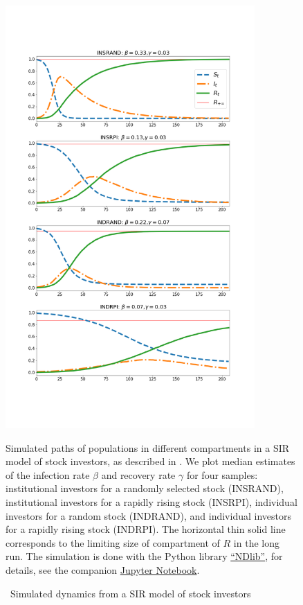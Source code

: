   \begin{figure} \centering  %
    \caption{ ~Simulated dynamics from a SIR model of stock investors}
    \label{fig:sir_simulate}
    \centerline{\includegraphics[width=0.85\textwidth,height=0.85\textheight]{./figures/sir_simulate}}
    \begin{flushleft}
      {\footnotesize Simulated paths of populations in different compartments in a SIR model of stock investors, as described in \cite{shiller1989survey}. We plot median estimates of the infection rate $\beta$ and recovery rate $\gamma$ for four samples: institutional investors for a randomly selected stock (INSRAND), institutional investors for a rapidly rising stock (INSRPI), individual investors for a random stock (INDRAND), and individual investors for a rapidly rising stock (INDRPI). The horizontal thin solid line corresponds to the limiting size of compartment of $R$ in the long run. The simulation is done with the Python library \href{https://ndlib.readthedocs.io/en/latest/}{``NDlib''}, for details, see the companion \href{https://github.com/llorracc/EpiExp/blob/master/SIR_Ndlib.ipynb}{Jupyter Notebook}. }
    \end{flushleft}
  \end{figure}
